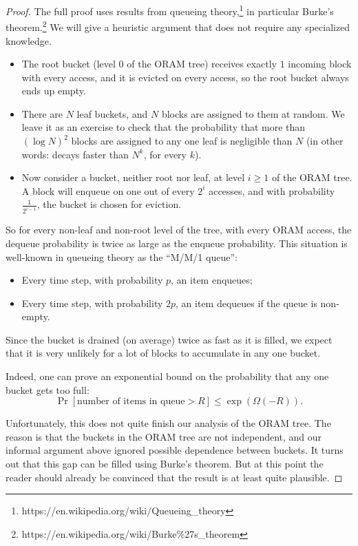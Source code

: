 \begin{proof}
The full proof uses results from queueing theory,\footnote{https://en.wikipedia.org/wiki/Queueing\_theory}
in particular Burke's theorem.\footnote{https://en.wikipedia.org/wiki/Burke\%27s\_theorem}
We will give a heuristic argument that does not require any specialized
knowledge.

\begin{itemize}
\item
  The root bucket (level \(0\) of the ORAM tree) receives exactly \(1\)
  incoming block with every access, and it is evicted on every access,
  so the root bucket always ends up empty.
\item
  There are \(N\) leaf buckets, and \(N\) blocks are assigned to them at
  random. We leave it as an exercise to check that the probability that
  more than \(( \log N )^{2}\) blocks are assigned to any one
  leaf is negligible than \(N\) (in other words: decays faster than
  \(N^{k}\), for every \(k\)).
\item
  Now consider a bucket, neither root nor leaf, at level \(i \geq 1\) of
  the ORAM tree. A block will enqueue on one out of every \(2^{i}\)
  accesses, and with probability \(\frac{1}{2^{i - 1}}\), the bucket is
  chosen for eviction.
\end{itemize}

So for every non-leaf and non-root level of the tree, with every ORAM
access, the dequeue probability is twice as large as the enqueue
probability. This situation is well-known in queueing theory as the
``M/M/1 queue'':

\begin{itemize}
\item
  Every time step, with probability \(p\), an item enqueues;
\item
  Every time step, with probability \(2p\), an item dequeues if the
  queue is non-empty.
\end{itemize}

Since the bucket is drained (on average) twice as fast as it is filled,
we expect that it is very unlikely for a lot of blocks to accumulate in
any one bucket.

Indeed, one can prove an exponential bound on the probability that any
one bucket gets too full:
\[\Pr [\mathrm{\text{number of items in queue}} > R] \leq \exp( \Omega( - R) ).\]

Unfortunately, this does not quite finish our analysis of the ORAM tree.
The reason is that the buckets in the ORAM tree are not independent, and
our informal argument above ignored possible dependence between buckets.
It turns out that this gap can be filled using Burke's theorem. But at
this point the reader should already be convinced that the result is at
least quite plausible.
\end{proof}

